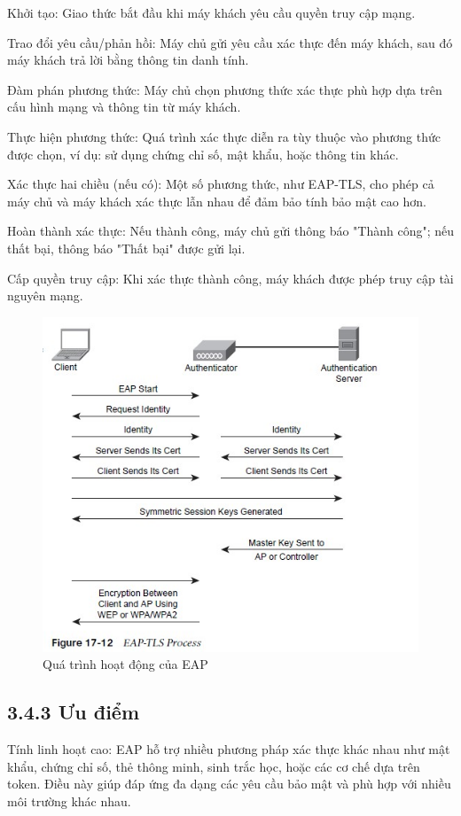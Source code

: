 Khởi tạo: Giao thức bắt đầu khi máy khách yêu cầu quyền truy cập mạng.

Trao đổi yêu cầu/phản hồi: Máy chủ gửi yêu cầu xác thực đến máy khách, sau đó máy khách trả lời bằng thông tin danh tính.

Đàm phán phương thức: Máy chủ chọn phương thức xác thực phù hợp dựa trên cấu hình mạng và thông tin từ máy khách.

Thực hiện phương thức: Quá trình xác thực diễn ra tùy thuộc vào phương thức được chọn, ví dụ: sử dụng chứng chỉ số, mật khẩu, hoặc thông tin khác.

Xác thực hai chiều (nếu có): Một số phương thức, như EAP-TLS, cho phép cả máy chủ và máy khách xác thực lẫn nhau để đảm bảo tính bảo mật cao hơn.

Hoàn thành xác thực: Nếu thành công, máy chủ gửi thông báo "Thành công"; nếu thất bại, thông báo "Thất bại" được gửi lại.

Cấp quyền truy cập: Khi xác thực thành công, máy khách được phép truy cập tài nguyên mạng.
    \begin{figure}[htbp]
        \centering
        \includegraphics[width=0.6\linewidth]{img/EAP-TLS-Process.jpeg}
        \caption{Quá trình hoạt động của EAP}
    \end{figure}

\subsection*{3.4.3 Ưu điểm}

 Tính linh hoạt cao: EAP hỗ trợ nhiều phương pháp xác thực khác nhau như mật khẩu, chứng chỉ số, thẻ thông minh, sinh trắc học, hoặc các cơ chế dựa trên token. Điều này giúp đáp ứng đa dạng các yêu cầu bảo mật và phù hợp với nhiều môi trường khác nhau.

